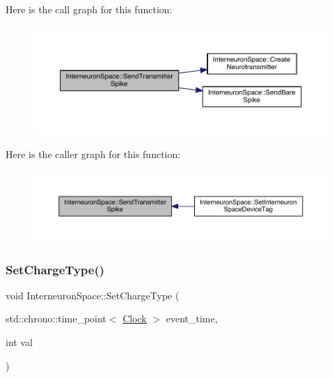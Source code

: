Here is the call graph for this function\+:\nopagebreak
\begin{figure}[H]
\begin{center}
\leavevmode
\includegraphics[width=350pt]{class_interneuron_space_a0a24da715aecafd4072d596fc271666f_cgraph}
\end{center}
\end{figure}
Here is the caller graph for this function\+:\nopagebreak
\begin{figure}[H]
\begin{center}
\leavevmode
\includegraphics[width=350pt]{class_interneuron_space_a0a24da715aecafd4072d596fc271666f_icgraph}
\end{center}
\end{figure}
\mbox{\label{class_interneuron_space_a404aacb1adce30288bb7b4237344e4cc}} 
\subsubsection{\texorpdfstring{Set\+Charge\+Type()}{SetChargeType()}}
{\footnotesize\ttfamily void Interneuron\+Space\+::\+Set\+Charge\+Type (\begin{DoxyParamCaption}\item[{std\+::chrono\+::time\+\_\+point$<$ \hyperlink{universe_8h_a0ef8d951d1ca5ab3cfaf7ab4c7a6fd80}{Clock} $>$}]{event\+\_\+time,  }\item[{int}]{val }\end{DoxyParamCaption})\hspace{0.3cm}{\ttfamily [inline]}}



